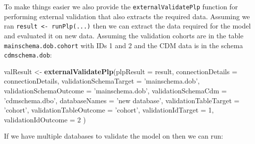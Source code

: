 \documentclass[11pt]{book}
\newenvironment{Shaded}{\begin{snugshade}}{\end{snugshade}}
\newcommand{\DataTypeTok}[1]{\textcolor[rgb]{0.13,0.29,0.53}{#1}}
\newcommand{\DecValTok}[1]{\textcolor[rgb]{0.00,0.00,0.81}{#1}}
\newcommand{\KeywordTok}[1]{\textcolor[rgb]{0.13,0.29,0.53}{\textbf{#1}}}
\newcommand{\NormalTok}[1]{#1}
\newcommand{\StringTok}[1]{\textcolor[rgb]{0.31,0.60,0.02}{#1}}
\theoremstyle{definition}
\theoremstyle{definition}
\theoremstyle{definition}
\theoremstyle{remark}
\begin{document}
To make things easier we also provide the \texttt{externalValidatePlp} function for performing external validation that also extracts the required data. Assuming we ran \texttt{result\ \textless{}-\ runPlp(...)} then we can extract the data required for the model and evaluated it on new data. Assuming the validation cohorts are in the table \texttt{mainschema.dob.cohort} with IDs 1 and 2 and the CDM data is in the schema \texttt{cdmschema.dob}:

\begin{Shaded}
\begin{Highlighting}[]
\NormalTok{valResult <-}\StringTok{ }\KeywordTok{externalValidatePlp}\NormalTok{(}\DataTypeTok{plpResult =}\NormalTok{ result, }
                                 \DataTypeTok{connectionDetails =}\NormalTok{ connectionDetails,}
                                 \DataTypeTok{validationSchemaTarget =} \StringTok{'mainschema.dob'}\NormalTok{,}
                                 \DataTypeTok{validationSchemaOutcome =} \StringTok{'mainschema.dob'}\NormalTok{,}
                                 \DataTypeTok{validationSchemaCdm =} \StringTok{'cdmschema.dbo'}\NormalTok{,}
                                 \DataTypeTok{databaseNames =} \StringTok{'new database'}\NormalTok{,}
                                 \DataTypeTok{validationTableTarget =} \StringTok{'cohort'}\NormalTok{,}
                                 \DataTypeTok{validationTableOutcome =} \StringTok{'cohort'}\NormalTok{,}
                                 \DataTypeTok{validationIdTarget =} \DecValTok{1}\NormalTok{,}
                                 \DataTypeTok{validationIdOutcome =} \DecValTok{2}
\NormalTok{          )}
\end{Highlighting}
\end{Shaded}

If we have multiple databases to validate the model on then we can run:
\end{document}
